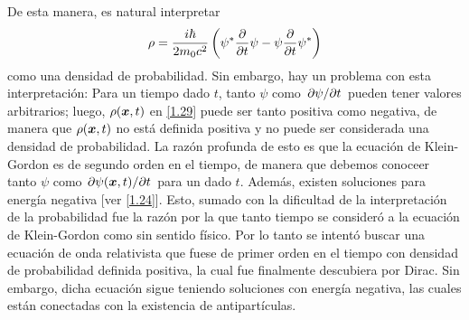 De esta manera, es natural interpretar
\begin{equation}
  \rho =\frac{i\hbar}{2m_0c^2}\left(\psi^*\pdv{t}\psi-\psi\pdv{t}\psi^*\right)
\end{equation}
como una densidad de probabilidad. Sin embargo, hay un problema con esta interpretación: Para un tiempo dado $t$, tanto $\psi$ como $\pdv*{\psi}{t}$ pueden tener valores arbitrarios; luego, $\rho(\vb*{x},t) $ en \eqref{1.29} puede ser tanto positiva como negativa, de manera que $\rho(\vb*{x},t) $ no está definida positiva y no puede ser considerada una densidad de probabilidad. La razón profunda de esto es que la ecuación de Klein-Gordon es de segundo orden en el tiempo, de manera que debemos conoceer tanto $\psi$ como $\pdv*{\psi(\vb*{x},t) }{t}$ para un dado $t$. Además, existen soluciones para energía negativa [ver \eqref{1.24}]. Esto, sumado con la dificultad de la interpretación de la probabilidad fue la razón por la que tanto tiempo se consideró a la ecuación de Klein-Gordon como sin sentido físico. Por lo tanto se intentó buscar una ecuación de onda relativista que fuese de primer orden en el tiempo con densidad de probabilidad definida positiva, la cual fue finalmente descubiera por Dirac. Sin embargo, dicha ecuación sigue teniendo soluciones con energía negativa, las cuales están conectadas con la existencia de antipartículas.

